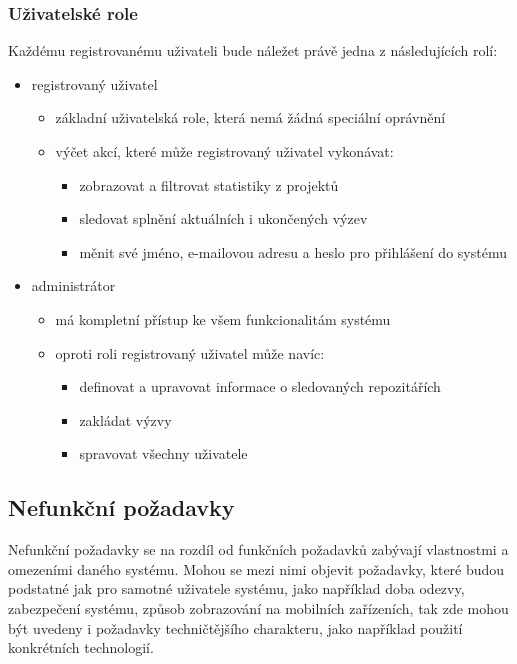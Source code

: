 \subsubsection{Uživatelské role}
Každému registrovanému uživateli bude náležet právě jedna z následujících rolí:
\begin{itemize}
    \item registrovaný uživatel
    \begin{itemize}[topsep=0pt]
        \item základní uživatelská role, která nemá žádná speciální oprávnění
        \item výčet akcí, které může registrovaný uživatel vykonávat:
        \begin{itemize}
            \item zobrazovat a filtrovat statistiky z projektů
            \item sledovat splnění aktuálních i ukončených výzev
            \item měnit své jméno, e-mailovou adresu a heslo pro přihlášení do systému
        \end{itemize}
    \end{itemize}
    \item administrátor
    \begin{itemize}[topsep=0pt]
        \item má kompletní přístup ke všem funkcionalitám systému
        \item oproti roli registrovaný uživatel může navíc:
        \begin{itemize}
            \item definovat a upravovat informace o sledovaných repozitářích
            \item zakládat výzvy
            \item spravovat všechny uživatele
        \end{itemize}
    \end{itemize}
\end{itemize}

\subsection{Nefunkční požadavky}
Nefunkční požadavky se na rozdíl od funkčních požadavků zabývají vlastnostmi a omezeními daného systému. Mohou se mezi nimi objevit požadavky, které budou podstatné jak pro samotné uživatele systému, jako například doba odezvy, zabezpečení systému, způsob zobrazování na mobilních zařízeních, tak zde mohou být uvedeny i požadavky techničtějšího charakteru, jako například použití konkrétních technologií.

